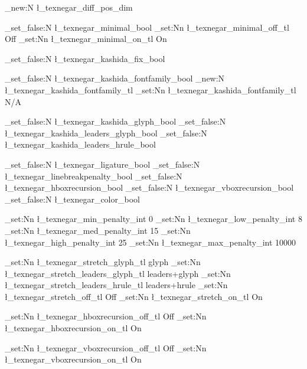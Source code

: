 \dim_new:N \l_texnegar_diff_pos_dim

\bool_set_false:N \l_texnegar_minimal_bool
\tl_set:Nn \l_texnegar_minimal_off_tl { Off }
\tl_set:Nn \l_texnegar_minimal_on_tl { On }

\bool_set_false:N \l_texnegar_kashida_fix_bool

\bool_set_false:N \l_texnegar_kashida_fontfamily_bool
\tl_new:N \l_texnegar_kashida_fontfamily_tl
\tl_set:Nn \l_texnegar_kashida_fontfamily_tl { N/A }

\bool_set_false:N \l_texnegar_kashida_glyph_bool
\bool_set_false:N \l_texnegar_kashida_leaders_glyph_bool
\bool_set_false:N \l_texnegar_kashida_leaders_hrule_bool

\bool_set_false:N \l_texnegar_ligature_bool
\bool_set_false:N \l_texnegar_linebreakpenalty_bool
\bool_set_false:N \l_texnegar_hboxrecursion_bool
\bool_set_false:N \l_texnegar_vboxrecursion_bool
\bool_set_false:N \l_texnegar_color_bool

\int_set:Nn \l_texnegar_min_penalty_int { 0 }
\int_set:Nn \l_texnegar_low_penalty_int { 8 }
\int_set:Nn \l_texnegar_med_penalty_int { 15 }
\int_set:Nn \l_texnegar_high_penalty_int { 25 }
\int_set:Nn \l_texnegar_max_penalty_int { 10000 }

\tl_set:Nn \l_texnegar_stretch_glyph_tl { glyph }
\tl_set:Nn \l_texnegar_stretch_leaders_glyph_tl { leaders+glyph }
\tl_set:Nn \l_texnegar_stretch_leaders_hrule_tl { leaders+hrule }
\tl_set:Nn \l_texnegar_stretch_off_tl { Off }
\tl_set:Nn \l_texnegar_stretch_on_tl { On }

\tl_set:Nn \l_texnegar_hboxrecursion_off_tl { Off }
\tl_set:Nn \l_texnegar_hboxrecursion_on_tl { On }

\tl_set:Nn \l_texnegar_vboxrecursion_off_tl { Off }
\tl_set:Nn \l_texnegar_vboxrecursion_on_tl { On }

